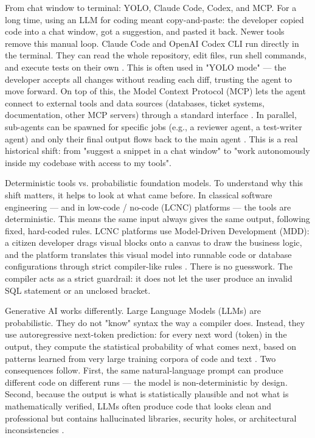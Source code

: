 \documentclass[10pt,a4paper]{article}
\begin{document}
From chat window to terminal: YOLO, Claude Code, Codex, and MCP. For a long time, using an LLM for coding meant copy-and-paste: the developer copied code into a chat window, got a suggestion, and pasted it back. Newer tools remove this manual loop. Claude Code and OpenAI Codex CLI run directly in the terminal. They can read the whole repository, edit files, run shell commands, and execute tests on their own \parencite{galster2026}. This is often used in "YOLO mode" — the developer accepts all changes without reading each diff, trusting the agent to move forward. On top of this, the Model Context Protocol (MCP) lets the agent connect to external tools and data sources (databases, ticket systems, documentation, other MCP servers) through a standard interface \parencite{galster2026}. In parallel, sub-agents can be spawned for specific jobs (e.g., a reviewer agent, a test-writer agent) and only their final output flows back to the main agent \parencite{galster2026}. This is a real historical shift: from "suggest a snippet in a chat window" to "work autonomously inside my codebase with access to my tools".

Deterministic tools vs. probabilistic foundation models. To understand why this shift matters, it helps to look at what came before. In classical software engineering — and in low-code / no-code (LCNC) platforms — the tools are deterministic. This means the same input always gives the same output, following fixed, hard-coded rules. LCNC platforms use Model-Driven Development (MDD): a citizen developer drags visual blocks onto a canvas to draw the business logic, and the platform translates this visual model into runnable code or database configurations through strict compiler-like rules \parencite{francois2025,gadde2025}. There is no guesswork. The compiler acts as a strict guardrail: it does not let the user produce an invalid SQL statement or an unclosed bracket.

Generative AI works differently. Large Language Models (LLMs) are probabilistic. They do not "know" syntax the way a compiler does. Instead, they use autoregressive next-token prediction: for every next word (token) in the output, they compute the statistical probability of what comes next, based on patterns learned from very large training corpora of code and text \parencite{mandl2026}. Two consequences follow. First, the same natural-language prompt can produce different code on different runs — the model is non-deterministic by design. Second, because the output is what is statistically plausible and not what is mathematically verified, LLMs often produce code that looks clean and professional but contains hallucinated libraries, security holes, or architectural inconsistencies \parencite{farrag2026}.
\end{document}

